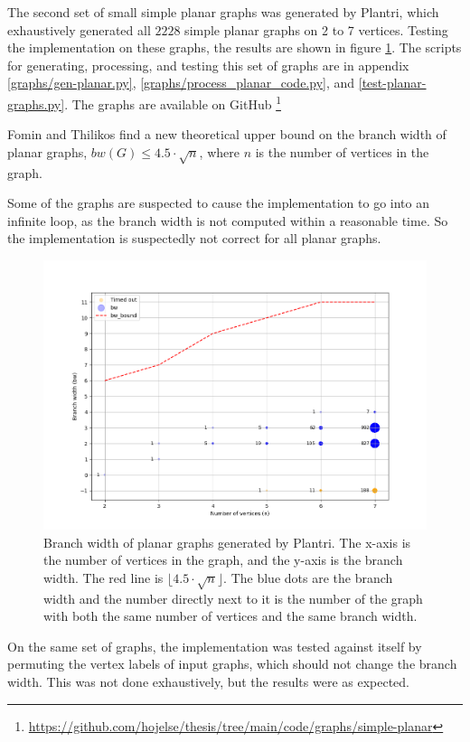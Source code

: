 \documentclass{article}
\begin{document}
	The second set of small simple planar graphs was generated by Plantri, which exhaustively generated all $2228$ simple planar graphs on 2 to 7 vertices. Testing the implementation on these graphs, the results are shown in figure \ref{fig:bw-planar}. The scripts for generating, processing, and testing this set of graphs are in appendix \ref{graphs/gen-planar.py}, \ref{graphs/process_planar_code.py}, and \ref{test-planar-graphs.py}. The graphs are available on GitHub \footnote{\url{https://github.com/hojelse/thesis/tree/main/code/graphs/simple-planar}}

	Fomin and Thilikos\cite{FT06} find a new theoretical upper bound on the branch width of planar graphs, $bw(G) \leq 4.5 \cdot \sqrt{n}$, where $n$ is the number of vertices in the graph.

	Some of the graphs are suspected to cause the implementation to go into an infinite loop, as the branch width is not computed within a reasonable time. So the implementation is suspectedly not correct for all planar graphs.

	\begin{figure}[H]
		\centering
		\includegraphics[width=\textwidth]{./images/bw-planar.png}
		\caption{Branch width of planar graphs generated by Plantri. The x-axis is the number of vertices in the graph, and the y-axis is the branch width. The red line is $\lfloor 4.5 \cdot \sqrt{n} \rfloor$. The blue dots are the branch width and the number directly next to it is the number of the graph with both the same number of vertices and the same branch width.}
		\label{fig:bw-planar}
	\end{figure}

	On the same set of graphs, the implementation was tested against itself by permuting the vertex labels of input graphs, which should not change the branch width. This was not done exhaustively, but the results were as expected.
\end{document}

